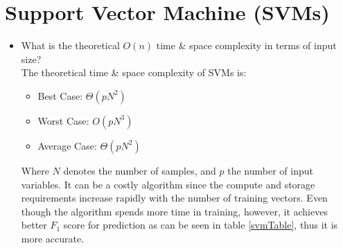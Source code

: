 \documentclass[twoside,openright,titlepage,numbers=noenddot,headinclude,%
               footinclude=true,cleardoublepage=empty,abstractoff,BCOR=5mm,%
               paper=a4,fontsize=11pt,ngerman,american]{scrreprt}
\numberwithin{theorem}{chapter}
\numberwithin{definition}{chapter}
\numberwithin{algorithm}{chapter}
\numberwithin{figure}{chapter}
\numberwithin{table}{chapter}
\numberwithin{equation}{chapter}
\begin{document}
\section*{Support Vector Machine (SVMs)}
\begin{itemize}
\item What is the theoretical $O(n)$ time \& space complexity in terms of input size?\\
The theoretical time \& space complexity of SVMs is:
\begin{itemize} 
\item Best Case: $\Theta(pN^2)$ 
\item Worst Case: $O(pN^3)$
\item Average Case: $\Theta(pN^2)$
\end{itemize}
Where $N$ denotes the number of samples, and $p$ the number of input variables. 
It can be a costly algorithm since the compute and storage requirements increase rapidly with the number of training vectors. Even though the algorithm spends more time in training, however, it achieves better $ F_1$ score for prediction as can be seen in table \ref{svmTable}, thus it is more accurate.


\end{itemize}
\end{document}
